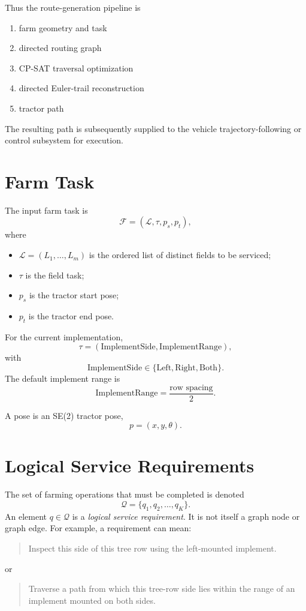 \documentclass{article}
\begin{document}
Thus the route-generation pipeline is

\begin{enumerate}
\item{farm geometry and task}
\item{directed routing graph}
\item{CP-SAT traversal optimization}
\item{directed Euler-trail reconstruction}
\item{tractor path}
\end{enumerate}

The resulting path is subsequently supplied to the vehicle trajectory-following or control subsystem for execution.

\section{Farm Task}

The input farm task is
$$
\mathcal{F}
=
\left(
    \mathcal{L},
    \tau,
    p_s,
    p_t
\right),
$$
where
\begin{itemize}
\item $\mathcal{L}=(L_1,\ldots,L_m)$ is the ordered list of distinct fields to be serviced;
\item $\tau$ is the field task;
\item $p_s$ is the tractor start pose;
\item $p_t$ is the tractor end pose.
\end{itemize}

For the current implementation,
$$
\tau =
\left(
    \text{ImplementSide},
    \text{ImplementRange}
\right),
$$
with
$$
\text{ImplementSide}
\in
\{\text{Left},\text{Right},\text{Both}\}.
$$
The default implement range is
$$
\text{ImplementRange}
=
\frac{\text{row spacing}}{2}.
$$

A pose is an SE(2) tractor pose,
$$
p=(x,y,\theta).
$$

\section{Logical Service Requirements}

The set of farming operations that must be completed is denoted
$$
\mathcal{Q}
=
\{q_1,q_2,\ldots,q_K\}.
$$
An element $q\in\mathcal{Q}$ is a \emph{logical service requirement}. It is not itself a graph node or graph edge.
For example, a requirement can mean:
\begin{quote}
Inspect this side of this tree row using the left-mounted implement.
\end{quote}
or
\begin{quote}
Traverse a path from which this tree-row side lies within the range of an implement mounted on both sides.
\end{quote}
\end{document}
